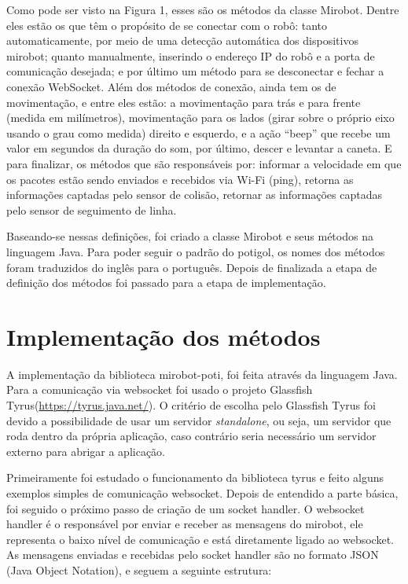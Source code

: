 Como pode ser visto na Figura 1, esses são os métodos da classe Mirobot. Dentre eles estão os que têm o propósito de se conectar com o robô: tanto
automaticamente, por meio de uma detecção automática dos dispositivos mirobot;
quanto manualmente, inserindo o endereço IP do robô e a porta de comunicação
desejada; e por último um método para se desconectar e fechar a conexão
WebSocket. Além dos métodos de conexão, ainda tem os de movimentação, e entre
eles estão: a movimentação para trás e para frente (medida em milímetros),
movimentação para os lados (girar sobre o próprio eixo usando o grau como
medida) direito e esquerdo, e a ação ``beep'' que recebe um valor em segundos
da duração do som, por último, descer e levantar a caneta. E para finalizar, os
métodos que são responsáveis por: informar a velocidade em que os pacotes estão
sendo enviados e recebidos via Wi-Fi (ping), retorna as informações captadas
pelo sensor de colisão, retornar as informações captadas pelo sensor de
seguimento de linha.

Baseando-se nessas definições, foi criado a classe Mirobot e seus métodos na
linguagem Java. Para poder seguir o padrão do potigol, os nomes dos métodos
foram traduzidos do inglês para o português. Depois de finalizada a etapa de
definição dos métodos foi passado para a etapa de implementação. 

\section{Implementação dos métodos}
\label{sec:implementacao}

A implementação da biblioteca mirobot-poti, foi feita através da linguagem Java.
Para a comunicação via websocket foi usado o projeto
Glassfish Tyrus(\url{https://tyrus.java.net/}). O critério de escolha pelo
Glassfish Tyrus foi devido a possibilidade de usar um servidor \textit{standalone}, ou
seja, um servidor que roda dentro da própria aplicação, caso contrário seria
necessário um servidor externo para abrigar a aplicação. 

Primeiramente foi estudado o funcionamento da biblioteca tyrus e feito alguns
exemplos simples de comunicação websocket. Depois de entendido a parte básica,
foi seguido o próximo passo de criação de um socket handler. O websocket
handler é o responsável por enviar e receber as mensagens do mirobot, ele
representa o baixo nível de comunicação e está diretamente ligado ao websocket.
As mensagens enviadas e recebidas pelo socket handler são no formato JSON (Java
Object Notation), e seguem a seguinte estrutura:

